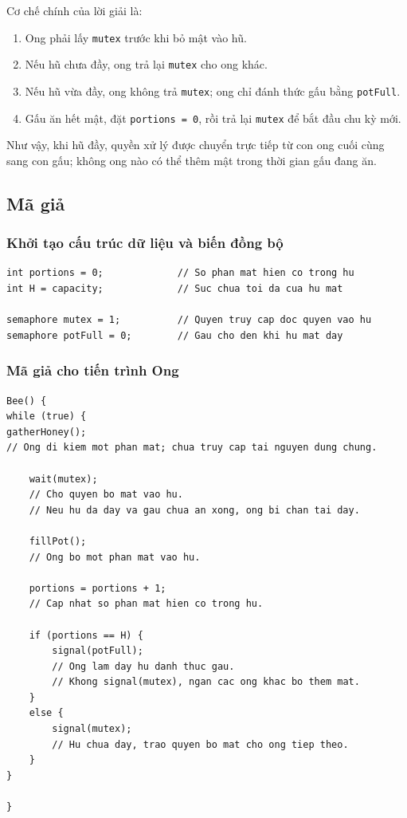 Cơ chế chính của lời giải là:

\begin{enumerate}
\item Ong phải lấy \texttt{mutex} trước khi bỏ mật vào hũ.
\item Nếu hũ chưa đầy, ong trả lại \texttt{mutex} cho ong khác.
\item Nếu hũ vừa đầy, ong không trả \texttt{mutex}; ong chỉ đánh
thức gấu bằng \texttt{potFull}.
\item Gấu ăn hết mật, đặt \texttt{portions = 0}, rồi trả lại
\texttt{mutex} để bắt đầu chu kỳ mới.
\end{enumerate}

Như vậy, khi hũ đầy, quyền xử lý được chuyển trực tiếp từ con ong cuối
cùng sang con gấu; không ong nào có thể thêm mật trong thời gian gấu
đang ăn.

\subsection{Mã giả}

\subsubsection*{Khởi tạo cấu trúc dữ liệu và biến đồng bộ}

\begin{lstlisting}
int portions = 0;             // So phan mat hien co trong hu
int H = capacity;             // Suc chua toi da cua hu mat

semaphore mutex = 1;          // Quyen truy cap doc quyen vao hu
semaphore potFull = 0;        // Gau cho den khi hu mat day
\end{lstlisting}

\subsubsection*{Mã giả cho tiến trình Ong}

\begin{lstlisting}
Bee() {
while (true) {
gatherHoney();
// Ong di kiem mot phan mat; chua truy cap tai nguyen dung chung.

    wait(mutex);
    // Cho quyen bo mat vao hu.
    // Neu hu da day va gau chua an xong, ong bi chan tai day.

    fillPot();
    // Ong bo mot phan mat vao hu.

    portions = portions + 1;
    // Cap nhat so phan mat hien co trong hu.

    if (portions == H) {
        signal(potFull);
        // Ong lam day hu danh thuc gau.
        // Khong signal(mutex), ngan cac ong khac bo them mat.
    }
    else {
        signal(mutex);
        // Hu chua day, trao quyen bo mat cho ong tiep theo.
    }
}

}
\end{lstlisting}

